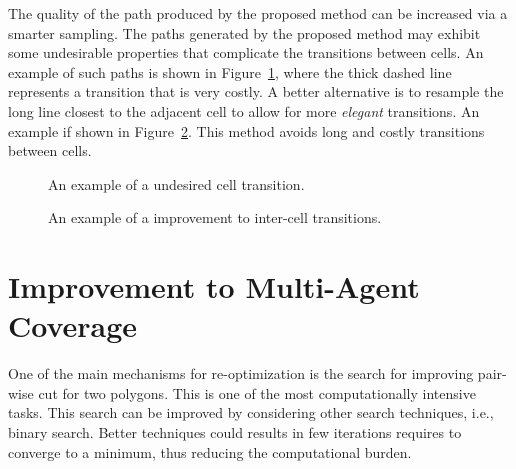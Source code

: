 \documentclass[../main.tex]{subfiles}
\begin{document}
The quality of the path produced by the proposed method can be increased via a smarter sampling. The paths generated by the proposed method may exhibit some undesirable properties  that complicate the transitions between cells. An example of such paths is shown in Figure~\ref{fig:cell_transition}, where the thick dashed line represents a transition that is very costly. A better alternative is to resample the long line closest to the adjacent cell to allow for more \emph{elegant} transitions. An example if shown in Figure~\ref{fig:cell_transition_better}. This method avoids long and costly transitions between cells.

\begin{figure}
	\centering
	
	\caption{An example of a undesired cell transition.}
	\label{fig:cell_transition}
\end{figure}

\begin{figure}
	\centering
	
	\caption{An example of a improvement to inter-cell transitions.}
	\label{fig:cell_transition_better}
\end{figure}


\section{Improvement to Multi-Agent Coverage}
\label{section:future_multi}

One of the main mechanisms for re-optimization is the search for improving pair-wise cut for two polygons. This is one of the most computationally intensive tasks. This search can be improved by considering other search techniques, i.e., binary search. Better techniques could results in few iterations requires to converge to a minimum, thus reducing the computational burden.

\end{document}
